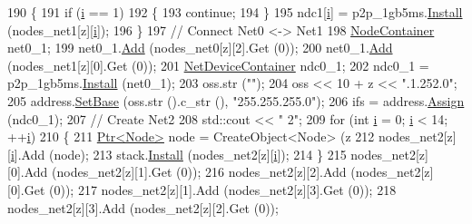 \begin{DoxyCode}
190         \{
191           \textcolor{keywordflow}{if} (\hyperlink{bernuolliDistribution_8m_a6f6ccfcf58b31cb6412107d9d5281426}{i} == 1)
192             \{
193               \textcolor{keywordflow}{continue};
194             \}
195           ndc1[\hyperlink{bernuolliDistribution_8m_a6f6ccfcf58b31cb6412107d9d5281426}{i}] = p2p\_1gb5ms.\hyperlink{classns3_1_1PointToPointHelper_ab9162fea3e88722666fed1106df1f9ec}{Install} (nodes\_net1[z][\hyperlink{bernuolliDistribution_8m_a6f6ccfcf58b31cb6412107d9d5281426}{i}]);
196         \}
197       \textcolor{comment}{// Connect Net0 <-> Net1}
198       \hyperlink{classns3_1_1NodeContainer}{NodeContainer} net0\_1;
199       net0\_1.\hyperlink{classns3_1_1NodeContainer_aa60b3a0e70f2fb324e16ffcf8bf31fcb}{Add} (nodes\_net0[z][2].Get (0));
200       net0\_1.\hyperlink{classns3_1_1NodeContainer_aa60b3a0e70f2fb324e16ffcf8bf31fcb}{Add} (nodes\_net1[z][0].Get (0));
201       \hyperlink{classns3_1_1NetDeviceContainer}{NetDeviceContainer} ndc0\_1;
202       ndc0\_1 = p2p\_1gb5ms.\hyperlink{classns3_1_1PointToPointHelper_ab9162fea3e88722666fed1106df1f9ec}{Install} (net0\_1);
203       oss.str (\textcolor{stringliteral}{""});
204       oss << 10 + z << \textcolor{stringliteral}{".1.252.0"};
205       address.\hyperlink{classns3_1_1Ipv4AddressHelper_acf7b16dd25bac67e00f5e25f90a9a035}{SetBase} (oss.str ().c\_str (), \textcolor{stringliteral}{"255.255.255.0"});
206       ifs = address.\hyperlink{classns3_1_1Ipv4AddressHelper_af8e7f4a1a7e74c00014a1eac445a27af}{Assign} (ndc0\_1);
207       \textcolor{comment}{// Create Net2}
208       std::cout << \textcolor{stringliteral}{" 2"};
209       \textcolor{keywordflow}{for} (\textcolor{keywordtype}{int} \hyperlink{bernuolliDistribution_8m_a6f6ccfcf58b31cb6412107d9d5281426}{i} = 0; \hyperlink{bernuolliDistribution_8m_a6f6ccfcf58b31cb6412107d9d5281426}{i} < 14; ++\hyperlink{bernuolliDistribution_8m_a6f6ccfcf58b31cb6412107d9d5281426}{i})
210         \{
211           \hyperlink{classns3_1_1Ptr}{Ptr<Node>} node = CreateObject<Node> (z %
212           nodes\_net2[z][\hyperlink{bernuolliDistribution_8m_a6f6ccfcf58b31cb6412107d9d5281426}{i}].Add (node);
213           stack.\hyperlink{classns3_1_1InternetStackHelper_a6645b412f31283d2d9bc3d8a95cebbc0}{Install} (nodes\_net2[z][\hyperlink{bernuolliDistribution_8m_a6f6ccfcf58b31cb6412107d9d5281426}{i}]);
214         \}
215       nodes\_net2[z][0].Add (nodes\_net2[z][1].Get (0));
216       nodes\_net2[z][2].Add (nodes\_net2[z][0].Get (0));
217       nodes\_net2[z][1].Add (nodes\_net2[z][3].Get (0));
218       nodes\_net2[z][3].Add (nodes\_net2[z][2].Get (0));

\end{DoxyCode}
